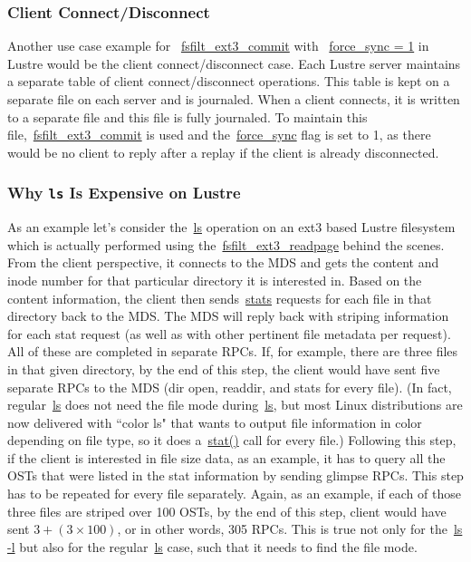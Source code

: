 \subsubsection{Client Connect/Disconnect}

Another use case example for ~\url{fsfilt_ext3_commit} with ~\url{force_sync = 1} in
Lustre would be the client connect/disconnect case. Each Lustre server
maintains a separate table of client connect/disconnect operations. This table
is kept on a separate file on each server and is journaled.  When a client
connects, it is written to a separate file and this file is fully journaled. To
maintain this file,~\url{fsfilt_ext3_commit} is used and the~\url{force_sync}
flag is set to 1, as there would be no client to reply after a replay if the
client is already disconnected.

\subsubsection{Why \texttt{\small ls} Is Expensive on Lustre}

As an example let's consider the~\url{ls} operation on an ext3 based Lustre
filesystem which is actually performed using the~\url{fsfilt_ext3_readpage}
behind the scenes.  From the client perspective, it connects to the MDS and gets
the content and inode number for that particular directory it is interested in.
Based on the content information, the client then sends~\url{stats} requests
for each file in that directory back to the MDS. The MDS will reply back with
striping information for each stat request (as well as with other pertinent
file metadata per request). All of these are completed in separate RPCs. If,
for example, there are three files in that given directory, by the end of this
step, the client would have sent five separate RPCs to the MDS (dir open, readdir,
and stats for every file). (In fact, regular~\url{ls} does not need the file
mode during~\url{ls}, but most Linux distributions are now delivered with
``color ls" that wants to output file information in color depending on file
type, so it does a~\url{stat()} call for every file.)  Following this step, if
the client is interested in file size data, as an example, it has to query all the
OSTs that were listed in the stat information by sending glimpse RPCs. This step
has to be repeated for every file separately. Again, as an example, if each of
those three files are striped over 100 OSTs, by the end of this step, client would
have sent $ 3 + ( 3 \times 100) $, or in other words, 305 RPCs. This is true
not only for the~\url{ls -l} but also for the regular~\url{ls} case,
such that it needs to find the file mode.
